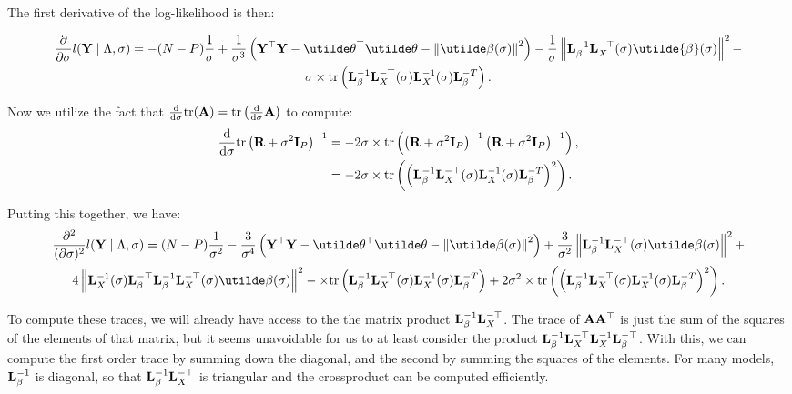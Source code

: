 \documentclass[10pt]{article}
\begin{document}
The first derivative of the log-likelihood is then:

\begin{multline*}
\frac{\partial}{\partial\sigma} l({\bf Y} \mid \Lambda,
\sigma ) = -(N-P)\frac{1}{\sigma} + \frac{1}{\sigma^3}\left({\bf Y}^\top{\bf
    Y}-\utilde\theta^\top\utilde\theta
  -\left\|\utilde\beta(\sigma)\right\|^2\right) -
\frac{1}{\sigma}\left\|{\bf L}_\beta^{-1}{\bf
  L}_X^{-\top}(\sigma)\utilde{\beta}(\sigma) \right\|^2 - \\
\sigma\times\mathrm{tr}\left({\bf
    L}_\beta^{-1}{\bf L}_X^{-\top}(\sigma){\bf L}_X^{-1}(\sigma){\bf L}_\beta^{-T}\right).
\end{multline*}

Now we utilize the fact that
$\frac{\mathrm{d}}{\mathrm{d}\sigma}\mathrm{tr}({\bf A}) =
\mathrm{tr}\left(\frac{\mathrm{d}}{\mathrm{d}\sigma} {\bf A}\right)$
to compute:
\begin{align*}
\frac{\mathrm{d}}{\mathrm{d}\sigma}\mathrm{tr} \left({\bf
    R}+\sigma^2{\bf I}_P\right)^{-1}  & =
-2\sigma\times\mathrm{tr} \left(\left({\bf R}+\sigma^2{\bf I}_P\right)^{-1}\left({\bf
      R}+\sigma^2{\bf I}_P\right)^{-1} \right), \\
& = -2\sigma\times\mathrm{tr} \left( \left({\bf
    L}_\beta^{-1}{\bf L}_X^{-\top}(\sigma){\bf L}_X^{-1}(\sigma){\bf
    L}_\beta^{-T} \right)^2  \right).
\end{align*}

Putting this together, we have:
\begin{multline*}
\frac{\partial^2}{(\partial\sigma)^2} l({\bf Y} \mid \Lambda,
\sigma ) = (N - P) \frac{1}{\sigma^2} - \frac{3}{\sigma^4} \left({\bf Y}^\top{\bf
    Y}-\utilde\theta^\top\utilde\theta
  -\left\|\utilde\beta(\sigma)\right\|^2\right) +
\frac{3}{\sigma^2}\left\| {\bf L}_\beta^{-1}{\bf
    L}_X^{-\top}(\sigma)\utilde\beta(\sigma) \right\|^2 + \\
4\left\| {\bf L}_X^{-1}(\sigma){\bf L}_\beta^{-\top} {\bf L}_\beta^{-1}{\bf
    L}_X^{-\top}(\sigma)\utilde\beta(\sigma) \right\|^2 -
\times\mathrm{tr}\left({\bf
    L}_\beta^{-1}{\bf L}_X^{-\top}(\sigma){\bf L}_X^{-1}(\sigma){\bf
    L}_\beta^{-T}\right) + 2\sigma^2\times\mathrm{tr}\left( \left( {\bf
    L}_\beta^{-1}{\bf L}_X^{-\top}(\sigma){\bf L}_X^{-1}(\sigma){\bf L}_\beta^{-T}\right)^2 \right).
\end{multline*}

To compute these traces, we will already have access to the the matrix
product ${\bf L}_\beta^{-1}{\bf L}_X^{-\top}$. The trace of ${\bf
  A}{\bf A}^\top$ is just the sum of the squares of the elements of
that matrix, but it seems unavoidable for us to at least consider the
product ${\bf L}_\beta^{-1}{\bf L}_X^{-\top}{\bf L}_X^{-1}{\bf
  L}_\beta^{-\top}$. With this, we can compute the first order trace
by summing down the diagonal, and the second by summing the squares of
the elements. For many models, ${\bf L}_\beta^{-1}$ is diagonal, so
that ${\bf L}_\beta^{-1}{\bf L}_X^{-\top}$ is triangular and the
crossproduct can be computed efficiently.
\end{document}

